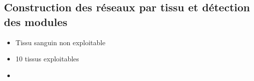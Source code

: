 





\subsection{Construction des réseaux par tissu et détection des modules}



\begin{itemize}
    \item Tissu sanguin non exploitable
    \item 10 tissus exploitables
    \item 
    
\end{itemize}

